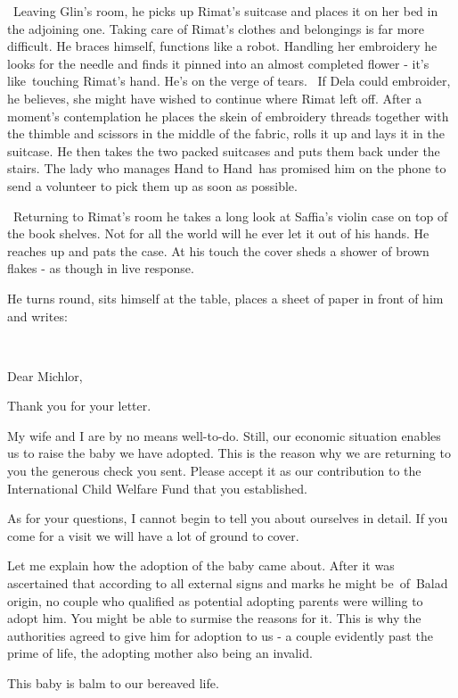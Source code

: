 \documentclass[12pt]{book}
\begin{document}
\ Leaving Glin's room, he picks up Rimat's suitcase and places it on her bed in the adjoining one. Taking care of
Rimat's clothes and belongings is far more difficult. He braces himself, functions like a robot. Handling her
embroidery he looks for the needle and finds it pinned into an almost completed flower - it's like~touching Rimat's
hand. He's on the verge of tears{.} \ If Dela could embroider, he believes, she
might have wished to continue where Rimat left off. After a moment's contemplation he places the skein of embroidery
threads together with the thimble and scissors in the middle of the fabric, rolls it up and lays it in the suitcase. He
then takes the two packed suitcases and puts them back under the stairs. The lady who manages {\textquotedbl}Hand to
Hand{\textquotedbl}~has promised him on the phone to send a volunteer to pick them up as soon as possible.

\ Returning to Rimat's room he takes a long look at Saffia's violin case on top of the book shelves. Not for
all{ }the world will he ever let it out of his hands. He reaches up and pats
the case. At his touch the cover sheds a shower of brown flakes - as though in live response.

He turns round, sits himself at the table, places a sheet of paper in front of him and writes:

~

Dear Michlor,

Thank you for your letter.

My wife and I are by no means well-to-do. Still, our economic situation enables us to raise the baby we have adopted.
This is the reason why we are returning to you the generous check you sent. Please accept it as our contribution to the
International Child Welfare Fund that you established.

As for your questions, I cannot begin to tell you about ourselves in detail. If you come for a visit we will have a lot
of ground to cover.

Let me explain how the adoption of the baby came about. After it was ascertained that according to all external signs
and marks he might be~of~Balad origin, no couple who qualified as potential adopting parents were willing to adopt him.
You might be able to surmise the reasons for it. This is why the authorities agreed to give him for adoption to us - a
couple evidently past the prime of life, the adopting mother also being an invalid.

This baby is balm to our bereaved life.
\end{document}
